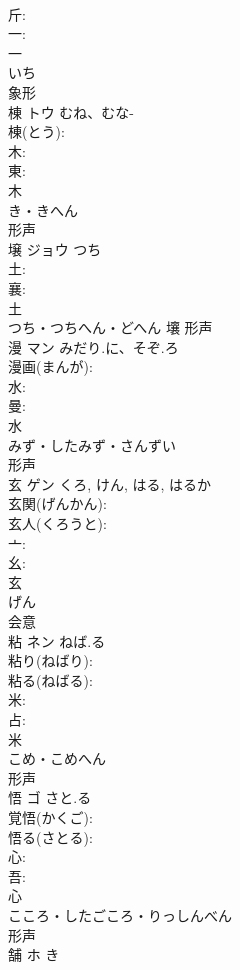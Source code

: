 \documentclass[8pt]{extreport}
\begin{document}
\begin{CJK}{UTF8}{min}
\\	斤: 
\\	一: 
\\	一	
\\	いち	
\\	象形 
\\	棟	トウ	むね、むな-		
\\	棟(とう): 
\\	木: 
\\	東: 
\\	木	
\\	き・きへん	
\\	形声 
\\	壌	ジョウ	つち		
\\	土: 
\\	襄: 
\\	土	
\\	つち・つちへん・どへん	壤	形声 
\\	漫	マン	みだり.に、そぞ.ろ		
\\	漫画(まんが): 
\\	水: 
\\	曼: 
\\	水	
\\	みず・したみず・さんずい	
\\	形声 
\\	玄	ゲン		くろ, けん, はる, はるか	
\\	玄関(げんかん): 
\\	玄人(くろうと): 
\\	亠: 
\\	幺: 
\\	玄	
\\	げん	
\\	会意 
\\	粘	ネン	ねば.る		
\\	粘り(ねばり): 
\\	粘る(ねばる): 
\\	米: 
\\	占: 
\\	米	
\\	こめ・こめへん	
\\	形声 
\\	悟	ゴ	さと.る		
\\	覚悟(かくご): 
\\	悟る(さとる): 
\\	心: 
\\	吾: 
\\	心	
\\	こころ・したごころ・りっしんべん	
\\	形声 
\\	舗	ホ		き	

\end{CJK}
\end{document}
